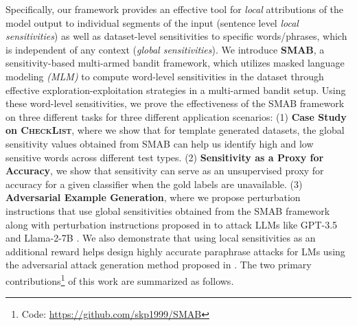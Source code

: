 Specifically, our framework provides an effective tool for \textit{local} attributions of the model output to individual segments of the input (sentence level \textit{local sensitivities}) as well as dataset-level sensitivities to specific words/phrases, which is independent of any context (\textit{global sensitivities}). We introduce \textbf{SMAB}, a sensitivity-based multi-armed bandit framework, which utilizes masked language modeling \textit{(MLM)} to compute word-level sensitivities in the dataset through effective exploration-exploitation strategies in a multi-armed bandit setup. Using these word-level sensitivities, we prove the effectiveness of the SMAB framework on three different tasks for three different application scenarios: (1) \textbf{Case Study on \textsc{CheckList}}, where we show that for template generated datasets, the global sensitivity values obtained from SMAB can help us identify high and low sensitive words across different test types. (2) \textbf{Sensitivity as a Proxy for Accuracy}, we show that sensitivity can serve as an unsupervised proxy for accuracy for a given classifier when the gold labels are unavailable. (3) \textbf{Adversarial Example Generation}, where we propose perturbation instructions that use global sensitivities obtained from the SMAB framework along with perturbation instructions proposed in \citet{xu2023llmfoolitselfpromptbased} to attack LLMs like GPT-3.5 \cite{brown2020languagemodelsfewshotlearners} and Llama-2-7B \cite{touvron2023llama2openfoundation}. We also demonstrate that using local sensitivities as an additional reward helps design highly accurate paraphrase attacks for LMs using the adversarial attack generation method proposed in \citet{roth2024constraintenforcingrewardadversarialattacks}. The two primary  contributions\footnote{Code: \href{https://github.com/skp1999/SMAB}{https://github.com/skp1999/SMAB}} of this work are summarized as follows.
